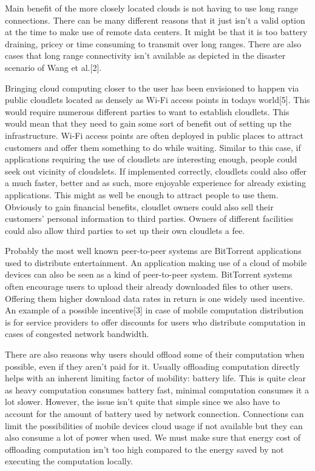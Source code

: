 \documentclass[conference]{IEEEtran}
\begin{document}
\par
Main benefit of the more closely located clouds is not having to use long range connections. There can be many different reasons that it just isn't a valid option at the time to make use of remote data centers. It might be that it is too battery draining, pricey or time consuming to transmit over long ranges. There are also cases that long range connectivity isn't available as depicted in the disaster scenario of Wang et al.[2].
\par
Bringing cloud computing closer to the user has been envisioned to happen via public cloudlets located as densely as Wi-Fi access points in todays world[5]. This would require numerous different parties to want to establish cloudlets. This would mean that they need to gain some sort of benefit out of setting up the infrastructure. Wi-Fi access points are often deployed in public places to attract customers and offer them something to do while waiting. Similar to this case, if applications requiring the use of cloudlets are interesting enough, people could seek out vicinity of cloudslets. If implemented correctly, cloudlets could also offer a much faster, better and as such, more enjoyable experience for already existing applications. This might as well be enough to attract people to use them. Obviously to gain financial benefits, cloudlet owners could also sell their customers' personal information to third parties. Owners of different facilities could also allow third parties to set up their own cloudlets a fee.
\par
Probably the most well known peer-to-peer systems are BitTorrent applications used to distribute entertainment. An application making use of a cloud of mobile devices can also be seen as a kind of peer-to-peer system. BitTorrent systems often encourage users to upload their already downloaded files to other users. Offering them higher download data rates in return is one widely used incentive. An example of a possible incentive[3] in case of mobile computation distribution is for service providers to offer discounts for users who distribute computation in cases of congested network bandwidth.
\par
There are also reasons why users should offload some of their computation when possible, even if they aren't paid for it. Usually offloading computation directly helps with an inherent limiting factor of mobility: battery life. This is quite clear as heavy computation consumes battery fast, minimal computation consumes it a lot slower. However, the issue isn't quite that simple since we also have to account for the amount of battery used by network connection. Connections can limit the possibilities of mobile devices cloud usage if not available but they can also consume a lot of power when used. We must make sure that energy cost of offloading computation isn't too high compared to the energy saved by not executing the computation locally.
\end{document}
